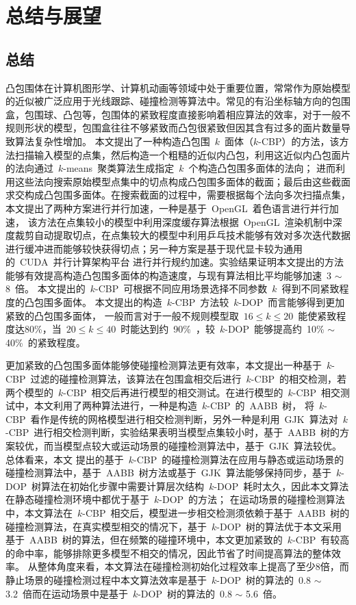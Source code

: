 

\chapter{总结与展望}
\label{cha:summery:futurework}
\section{总结}
\label{sec:summery}

凸包围体在计算机图形学、计算机动画等领域中处于重要位置，常常作为原始模型的近似被广泛应用于光线跟踪、碰撞检测等算法中。常见的有沿坐标轴方向的包围盒，包围球、凸包等，包围体的紧致程度直接影响着相应算法的效率，对于一般不规则形状的模型，包围盒往往不够紧致而凸包很紧致但因其含有过多的面片数量导致算法复杂性增加。
本文提出了一种构造凸包围~$k$~面体（$k$-CBP）的方法，该方法扫描输入模型的点集，然后构造一个粗糙的近似内凸包，利用这近似内凸包面片的法向通过~$k$-means~聚类算法生成指定~$k$~个构造凸包围多面体的法向；
进而利用这些法向搜索原始模型点集中的切点构成凸包围多面体的截面；最后由这些截面求交构成凸包围多面体。在搜索截面的过程中，需要根据每个法向多次扫描点集，本文提出了两种方案进行并行加速，一种是基于~OpenGL~着色语言进行并行加速，
该方法在点集较小的模型中利用深度缓存算法根据~OpenGL~渲染机制中深度裁剪自动提取切点，在点集较大的模型中利用乒乓技术能够有效对多次迭代数据进行缓冲进而能够较快获得切点；另一种方案是基于现代显卡较为通用的~CUDA~并行计算架构平台
进行并行规约加速。实验结果证明本文提出的方法能够有效提高构造凸包围多面体的构造速度，与现有算法相比平均能够加速~3 $\sim$ 8~倍。
本文提出的~$k$-CBP~可根据不同应用场景选择不同参数~$k$~得到不同紧致程度的凸包围多面体。
本文提出的构造~$k$-CBP~方法较~$k$-DOP~而言能够得到更加紧致的凸包围多面体，
一般而言对于一般不规则模型取~$16 \leq k \leq 20$~能使紧致程度达80\%，当~$20 \leq k \leq 40 $~时能达到约~90\%~，较~$k$-DOP~能够提高约~10\% $\sim$ 40\%~的紧致程度。

更加紧致的凸包围多面体能够使碰撞检测算法更有效率，本文提出一种基于~$k$-CBP~过滤的碰撞检测算法，该算法在包围盒相交后进行~$k$-CBP~的相交检测，若两个模型的~$k$-CBP~相交后再进行模型的相交测试。在进行模型的~$k$-CBP~相交测试中，本文利用了两种算法进行，一种是构造~$k$-CBP~的~AABB~树，
将~$k$-CBP~看作是传统的网格模型进行相交检测判断，另外一种是利用~GJK~算法对~$k$-CBP~进行相交检测判断，实验结果表明当模型点集较小时，基于~AABB~树的方案较优，而当模型点较大或运动场景的碰撞检测算法中，基于~GJK~算法较优。总体看来，本文
提出的基于~$k$-CBP~的碰撞检测算法在应用与静态或运动场景的碰撞检测算法中，基于~AABB~树方法或基于~GJK~算法能够保持同步，基于~$k$-DOP~树算法在初始化步骤中需要计算层次结构~$k$-DOP~耗时太久，因此本文算法在静态碰撞检测环境中都优于基于~$k$-DOP~的方法；
在运动场景的碰撞检测算法中，本文算法在~$k$-CBP~相交后，模型进一步相交检测须依赖于基于~AABB~树的碰撞检测算法，在真实模型相交的情况下，基于~$k$-DOP~树的算法优于本文采用基于~AABB~树的算法，但在频繁的碰撞环境中，本文更加紧致的~$k$-CBP~有较高的命中率，能够排除更多模型不相交的情况，因此节省了时间提高算法的整体效率。
从整体角度来看，本文算法在碰撞检测初始化过程效率上提高了至少8倍，而静止场景的碰撞检测过程中本文算法效率是基于~$k$-DOP~树的算法的~0.8 $\sim$ 3.2~倍而在运动场景中是基于~$k$-DOP~树的算法的~0.8 $\sim$ 5.6~倍。

